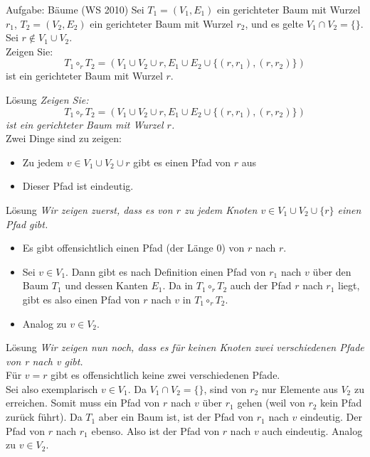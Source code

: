 \begin{frame}{Aufgabe: Bäume (WS 2010)}
	Sei $T_1 = (V_1 , E_1 )$ ein gerichteter Baum mit Wurzel $r_1$, $T_2 = (V_2 , E_2 )$ ein gerichteter Baum mit Wurzel $r_2$, und es gelte $V_1 \cap V_2 = \{\}$. Sei $r \not\in V_1 \cup V_2$. \\
Zeigen Sie: $$T_1 \circ_r T_2 = (V_1 \cup V_2 \cup {r}, E_1 \cup E_2 \cup \{(r, r_1 ), (r, r_2 )\})$$ ist ein gerichteter Baum mit Wurzel $r$.
\end{frame}

\begin{frame}{Lösung}
	\textit{Zeigen Sie: $$T_1 \circ_r T_2 = (V_1 \cup V_2 \cup {r}, E_1 \cup E_2 \cup \{(r, r_1 ), (r, r_2 )\})$$ ist ein gerichteter Baum mit Wurzel $r$.} \\[2em] \pause
	Zwei Dinge sind zu zeigen:
	\begin{itemize}[<+->]
		\item Zu jedem $v \in V_1 \cup V_2 \cup {r}$ gibt es einen Pfad von $r$ aus
		\item Dieser Pfad ist eindeutig.
	\end{itemize}
\end{frame}

\begin{frame}{Lösung}
	\textit{Wir zeigen zuerst, dass es von $r$ zu jedem Knoten $v \in V_1 \cup V_2 \cup \{r\}$ einen Pfad
gibt.} \\[2em]
	\pause
	\begin{itemize}[<+->]
		\item Es gibt offensichtlich einen Pfad (der Länge 0) von $r$ nach $r$.
		\item Sei $v \in V_1$. Dann gibt es nach Definition einen Pfad von $r_1$ nach $v$ über den Baum $T_1$ und dessen Kanten $E_1$. Da in $T_1 \circ_r T_2$ auch der Pfad $r$ nach $r_1$ liegt, gibt es also einen Pfad von $r$ nach $v$ in $T_1 \circ_r T_2$.
		\item Analog zu $v \in V_2$.
	\end{itemize}
\end{frame}

\begin{frame}{Lösung}
	\textit{Wir zeigen nun noch, dass es für keinen Knoten zwei verschiedenen Pfade von r nach v gibt.} \\[2em]\pause
	Für $v = r$ gibt es offensichtlich keine zwei verschiedenen Pfade. \pause \\ Sei also exemplarisch $v \in V_1$. Da $V_1 \cap V_2 = \{\}$, sind von $r_2$ nur Elemente aus $V_2$ zu erreichen. Somit muss ein Pfad von $r$ nach $v$ über $r_1$ gehen (weil von $r_2$ kein Pfad zurück führt). \pause Da $T_1$ aber ein Baum ist, ist der Pfad von $r_1$ nach $v$ eindeutig. Der Pfad von $r$ nach $r_1$ ebenso. \pause Also ist der Pfad von $r$ nach $v$ auch eindeutig. Analog zu $v \in V_2$.
\end{frame}

